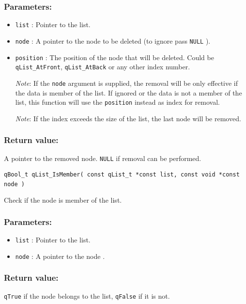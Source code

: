 \documentclass{article}
\begin{document}
\subsubsection*{Parameters:}
\begin{itemize}
    \item \lstinline{list} : Pointer to the list. 
    \item \lstinline{node} : A pointer to the node to be deleted (to ignore pass \lstinline{NULL} ).
    \item \lstinline{position} : The position of the node that will be deleted. Could be \lstinline{qList_AtFront}, \lstinline{qList_AtBack} or any other index number.
    
    \textit{Note}: If the \lstinline{node} argument is supplied, the removal will be only effective if the data is member of the list. If ignored or the data is not a member of the list, this function will use the \lstinline{position} instead as index for removal.
    
    \textit{Note}: If the index exceeds the size of the list, the last node  will be removed.
\end{itemize}

\subsubsection*{Return value:}
A pointer to the removed node. \lstinline{NULL} if removal can be performed.

\noindent\hrulefill

\begin{lstlisting}[style=CStyle]
qBool_t qList_IsMember( const qList_t *const list, const void *const node )
\end{lstlisting}

Check if the node is member of the list. 

\subsubsection*{Parameters:}
\begin{itemize}
    \item \lstinline{list} : Pointer to the list. 
    \item \lstinline{node} : A pointer to the node .
\end{itemize}

\subsubsection*{Return value:}
\lstinline{qTrue} if the node belongs to the list, \lstinline{qFalse} if it is not.
\end{document}
